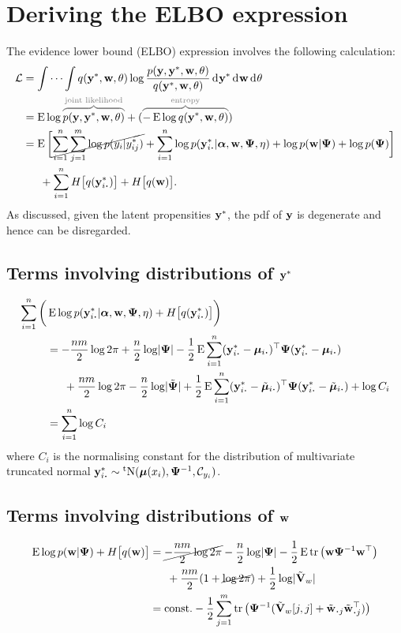 \section{Deriving the ELBO expression}

The evidence lower bound (ELBO) expression involves the following calculation:
\begin{align*}
  \cL &= \idotsint q(\by^*,\bw,\theta) 
  \log \frac{p(\by,\by^*,\bw,\theta)}{q(\by^*,\bw,\theta)}
  \dint\by^* \dint\bw \dint\theta \\
  &= \E \log \greyoverbrace{p(\by,\by^*,\bw,\theta)}{\text{joint likelihood}}
  +
  (\greyoverbrace{-\E \log q(\by^*,\bw,\theta)}{\text{entropy}}) \\
  &= \E\bigg[
  \cancel{\sum_{i=1}^n \sum_{j=1}^m \log  p(y_{i}|y_{ij}^*)} + 
  \sum_{i=1}^n \log  p(\by_{i \bigcdot}^*|\balpha,\bw,\bPsi,\eta) +
  \log p(\bw|\bPsi) +
  \log p(\bPsi) 
  \bigg] \\
  &\phantom{==} 
  + \sum_{i=1}^n H\big[q(\by^*_{i \bigcdot}) \big]
  + H\big[q(\bw) \big].
\end{align*}
As discussed, given the latent propensities ${\mathbf y}^*$, the pdf of ${\mathbf y}$ is degenerate and hence can be disregarded.  

\subsection{Terms involving distributions of \texorpdfstring{${\mathbf y}^*$}{$y^*$}}

\begin{align*}
  \sum_{i=1}^n  \bigg( &
  \E  \log p(\by_{i \bigcdot}^*|\balpha,\bw,\bPsi,\eta) 
  + H \big[q(\by^*_{i \bigcdot}) \big] 
  \bigg) \\
  &=  -\half[nm]\log 2\pi + \half[n] \log \abs{\bPsi} - \half \E \sum_{i=1}^n (\by^*_{i \bigcdot} - \bmu_{i \bigcdot})^\top \bPsi (\by^*_{i \bigcdot} - \bmu_{i \bigcdot}) \\
  &\phantom{==} +\half[nm]\log 2\pi - \half[n] \log \abs{\tilde\bPsi} + \half \E \sum_{i=1}^n (\by^*_{i \bigcdot} - \tilde\bmu_{i \bigcdot})^\top \bPsi (\by^*_{i \bigcdot} - \tilde\bmu_{i \bigcdot}) + \log C_i  \\
   &=\sum_{i=1}^n \log C_i 
\end{align*}
where $C_i$ is the normalising constant for the distribution of multivariate truncated normal $\by_{i \bigcdot}^* \sim \tN(\bmu(x_i),\bPsi^{-1},\cC_{y_i})$.

\subsection{Terms involving distributions of ${\mathbf w}$}

\begin{align*}
  \E \log p(\bw|\bPsi) + H \big[q(\bw) \big] 
  &= \cancel{-\half[nm]\log 2\pi} - \half[n]\log\abs{\bPsi} - \half\E\tr \big( \bw \bPsi^{-1} \bw^\top \big) \\
  &\phantom{==} + \half[nm](1 + \cancel{\log 2\pi}) + \half\log\abs{\tilde\bV_w} \\
  &= \const 
  - \half \sum_{j=1}^m \tr \big(\bPsi^{-1} (\tilde\bV_w[j,j]  + \tilde\bw_{\bigcdot j}\tilde\bw_{\bigcdot j}^\top)\big)
\end{align*}


